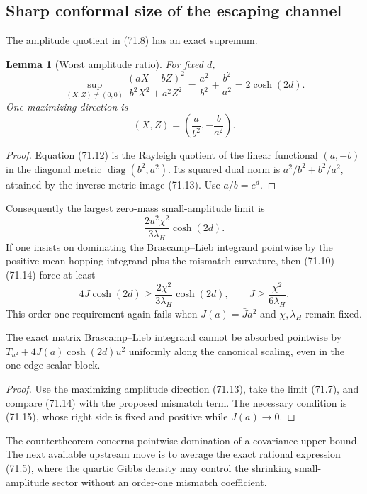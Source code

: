 \documentclass[11pt]{article}
\newtheorem{lemma}[theorem]{Lemma}
\theoremstyle{remark}
\begin{document}
\subsection{Sharp conformal size of the escaping channel}

The amplitude quotient in (71.8) has an exact supremum.

\begin{lemma}[Worst amplitude ratio]
\label{lem:v17v71-rayleigh}
For fixed \(d\),
\[
 \sup_{(X,Z)\neq(0,0)}
 \frac{(aX-bZ)^2}{b^2X^2+a^2Z^2}
 =\frac{a^2}{b^2}+\frac{b^2}{a^2}
 =2\cosh(2d).                                    \tag{71.12}
\]
One maximizing direction is
\[
 (X,Z)=\left(\frac a{b^2},-\frac b{a^2}\right). \tag{71.13}
\]
\end{lemma}

\begin{proof}
Equation (71.12) is the Rayleigh quotient of the linear functional
\((a,-b)\) in the diagonal metric
\(\operatorname{diag}(b^2,a^2)\).  Its squared dual norm is
\(a^2/b^2+b^2/a^2\), attained by the inverse-metric image (71.13).
Use \(a/b=e^d\).
\end{proof}

Consequently the largest zero-mass small-amplitude limit is
\[
 \frac{2u^2\chi^2}{3\lambda_H}\cosh(2d).         \tag{71.14}
\]
If one insists on dominating the Brascamp--Lieb integrand pointwise by
the positive mean-hopping integrand plus the mismatch curvature, then
(71.10)--(71.14) force at least
\[
 4J\cosh(2d)
 \geq\frac{2\chi^2}{3\lambda_H}\cosh(2d),
 \qquad
 J\geq\frac{\chi^2}{6\lambda_H}.                 \tag{71.15}
\]
This order-one requirement again fails when \(J(a)=\bar Ja^2\) and
\(\chi,\lambda_H\) remain fixed.

\begin{countertheorem}
\label{ctr:v17v71-pointwise}
The exact matrix Brascamp--Lieb integrand cannot be absorbed pointwise
by \(T_{u^2}+4J(a)\cosh(2d)u^2\) uniformly along the canonical
scaling, even in the one-edge scalar block.
\end{countertheorem}

\begin{proof}
Use the maximizing amplitude direction (71.13), take the limit
(71.7), and compare (71.14) with the proposed mismatch term.  The
necessary condition is (71.15), whose right side is fixed and positive
while \(J(a)\to0\).
\end{proof}

The countertheorem concerns pointwise domination of a covariance upper
bound.  The next available upstream move is to average the exact
rational expression (71.5), where the quartic Gibbs density may control
the shrinking small-amplitude sector without an order-one mismatch
coefficient.
\end{document}
